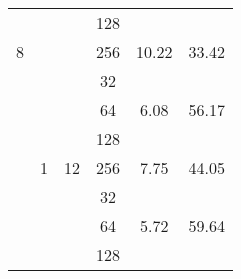 \begin{longtable}{cccccc}
                      & \cellcolor[HTML]{EFEFEF}{  }                    & \cellcolor[HTML]{EFEFEF}{  }                    & \cellcolor[HTML]{EFEFEF}128                     & \cellcolor[HTML]{EFEFEF}{  9.08}     & \cellcolor[HTML]{EFEFEF}{  37.58}    \\
\multirow{-16}{*}{8}  & \multirow{-4}{*}{\cellcolor[HTML]{EFEFEF}{  8}} & \multirow{-4}{*}{\cellcolor[HTML]{EFEFEF}{  1}} & 256                                             & {  10.22}                            & {  33.42}                            \\ \hline
                      & {  }                                            & {  }                                            & \cellcolor[HTML]{EFEFEF}32                      & \cellcolor[HTML]{EFEFEF}{  6.65}     & \cellcolor[HTML]{EFEFEF}{  51.35}    \\
                      & {  }                                            & {  }                                            & 64                                              & {  6.08}                             & {  56.17}                            \\
                      & {  }                                            & {  }                                            & \cellcolor[HTML]{EFEFEF}128                     & \cellcolor[HTML]{EFEFEF}{  6.46}     & \cellcolor[HTML]{EFEFEF}{  52.87}    \\
                      & \multirow{-4}{*}{{  1}}                         & \multirow{-4}{*}{{  12}}                        & 256                                             & {  7.75}                             & {  44.05}                            \\ \cline{2-6}
                      & \cellcolor[HTML]{EFEFEF}{  }                    & \cellcolor[HTML]{EFEFEF}{  }                    & \cellcolor[HTML]{EFEFEF}32                      & \cellcolor[HTML]{EFEFEF}{  6.35}     & \cellcolor[HTML]{EFEFEF}{  53.74}    \\
                      & \cellcolor[HTML]{EFEFEF}{  }                    & \cellcolor[HTML]{EFEFEF}{  }                    & 64                                              & {  5.72}                             & {  59.64}                            \\
                      & \cellcolor[HTML]{EFEFEF}{  }                    & \cellcolor[HTML]{EFEFEF}{  }                    & \cellcolor[HTML]{EFEFEF}128                     & \cellcolor[HTML]{EFEFEF}{  5.85}     & \cellcolor[HTML]{EFEFEF}{  58.37}    \\

\end{longtable}
